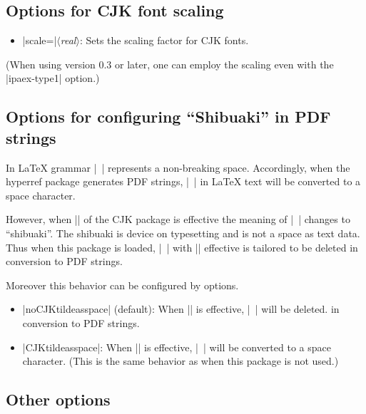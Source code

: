 \documentclass[a4paper]{article}
\newcommand{\Pkg}[1]{\textsf{#1}}
\newcommand{\Meta}[1]{$\langle$\textit{#1}$\rangle$}
\newcommand{\Means}{:\hspace{1em plus 1em}}
\begin{document}
\subsection{Options for CJK font scaling}

\begin{itemize}
\item |scale=|\Meta{real}\Means
  Sets the scaling factor for CJK fonts.
\end{itemize}

(When using version 0.3 or later, one can employ the scaling even with the
|ipaex-type1| option.)

\subsection{Options for configuring ``Shibuaki'' in PDF strings}

In {\LaTeX} grammar |~| represents a non-breaking space.
Accordingly, when the \Pkg{hyperref} package generates PDF strings,
|~| in {\LaTeX} text will be converted to a space character.

However, when |\CJKtilde| of the \Pkg{CJK} package is effective
the meaning of |~| changes to ``shibuaki''.
The shibuaki is device on typesetting and is not a space as text data.
Thus when this package is loaded, |~| with |\CJKtilde| effective
is tailored to be deleted in conversion to PDF strings.

Moreover this behavior can be configured by options.

\begin{itemize}
\item |noCJKtildeasspace| (default)\Means
  When |\CJKtilde| is effective, |~| will be deleted.
  in conversion to PDF strings.
\item |CJKtildeasspace|\Means
  When |\CJKtilde| is effective, |~| will be converted
  to a space character.
  (This is the same behavior as when this package is not used.)
\end{itemize}

\subsection{Other options}
\end{document}
